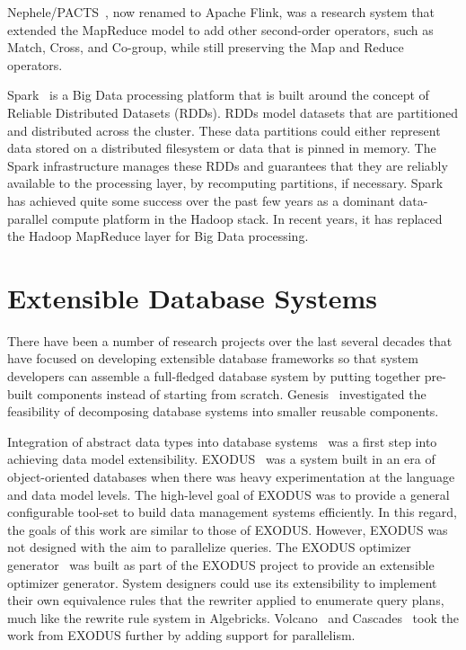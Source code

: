 Nephele/PACTS~\cite{NephelePACTs}, now renamed to Apache Flink, was a research system that extended the MapReduce model to add other second-order operators, such as Match, Cross, and Co-group, while still preserving the Map and Reduce operators.

Spark~\cite{DBLP:conf/hotcloud/ZahariaCFSS10} is a Big Data processing platform that is built around the concept of Reliable Distributed Datasets (RDDs). RDDs model datasets that are partitioned and distributed across the cluster. These data partitions could either represent data stored on a distributed filesystem or data that is pinned in memory. The Spark infrastructure manages these RDDs and guarantees that they are reliably available to the processing layer, by recomputing partitions, if necessary. Spark has achieved quite some success over the past few years as a dominant data-parallel compute platform in the Hadoop stack. In recent years, it has replaced the Hadoop MapReduce layer for Big Data processing.

\section{Extensible Database Systems}

There have been a number of research projects over the last several decades that have focused on developing extensible database frameworks so that system developers can assemble a full-fledged database system by putting together pre-built components instead of starting from scratch.
Genesis~\cite{Batory:1986:GPD:318826.318854} investigated the feasibility of decomposing database systems into smaller reusable components. 

Integration of abstract data types into database systems~\cite{Stonebraker86} was a first step into achieving data model extensibility.
EXODUS~\cite{Carey:1986:AEE:318826.318839} was a system built in an era of object-oriented databases when there was heavy experimentation at the language and data model levels. 
The high-level goal of EXODUS was to provide a general configurable tool-set to build data management systems efficiently. 
In this regard, the goals of this work are similar to those of EXODUS. However, EXODUS was not designed with the aim to parallelize queries.
The EXODUS optimizer generator~\cite{Graefe:1987:EOG:38714.38734} was built as part of the EXODUS project to provide an extensible optimizer generator. 
System designers could use its extensibility to implement their own equivalence rules that the rewriter applied to enumerate query plans, much like the rewrite rule system in Algebricks. 
Volcano~\cite{journals/tkde/Graefe94} and Cascades~\cite{Cascades} took the work from EXODUS further by adding support for parallelism.
